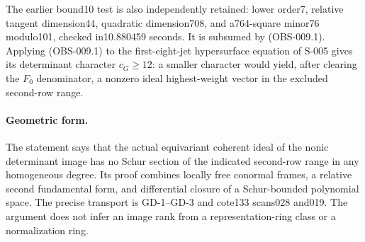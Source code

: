 The earlier bound10 test is also independently retained: lower order7,
relative tangent dimension44, quadratic dimension708, and a764-square
minor76 modulo101, checked in10.880459 seconds. It is subsumed by
(OBS-009.1). Applying (OBS-009.1) to the first-eight-jet hypersurface
equation of S-005 gives its determinant character $c_G\geq12$: a
smaller character would yield, after clearing the $F_0$ denominator,
a nonzero ideal highest-weight vector in the excluded second-row range.

\paragraph{Geometric form.}
The statement says that the actual equivariant coherent ideal of the
nonic determinant image has no Schur section of the indicated second-row
range in any homogeneous degree. Its proof combines locally free
conormal frames, a relative second fundamental form, and differential
closure of a Schur-bounded polynomial space. The precise transport is
GD-1--GD-3 and cote133 scans028 and019. The argument does not infer an
image rank from a representation-ring class or a normalization ring.
